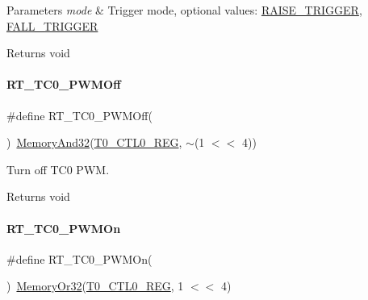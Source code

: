 \begin{DoxyParams}{Parameters}
{\em mode} & Trigger mode, optional values\+: \mbox{\hyperlink{a00020_abda90eda34a640b130f48a6ade23fe22}{R\+A\+I\+S\+E\+\_\+\+T\+R\+I\+G\+G\+ER}}, \mbox{\hyperlink{a00020_a9bbaf5b9e2125c7597249c7113b20e6c}{F\+A\+L\+L\+\_\+\+T\+R\+I\+G\+G\+ER}} \\
\hline
\end{DoxyParams}
\begin{DoxyReturn}{Returns}
void 
\end{DoxyReturn}
\mbox{\label{a00041_a043d535ff9aad665ddf1521169a0f187}} 
\paragraph{\texorpdfstring{R\+T\+\_\+\+T\+C0\+\_\+\+P\+W\+M\+Off}{RT\_TC0\_PWMOff}}
{\footnotesize\ttfamily \#define R\+T\+\_\+\+T\+C0\+\_\+\+P\+W\+M\+Off(\begin{DoxyParamCaption}{ }\end{DoxyParamCaption})~\mbox{\hyperlink{a00020_ad87cedffcaadc51db22594fce55173d4}{Memory\+And32}}(\mbox{\hyperlink{a00020_adadaa0ab1ebbd7ba9b70dfd24c3ed44da869abf9d87f78f45a0e07ad352abb39e}{T0\+\_\+\+C\+T\+L0\+\_\+\+R\+EG}}, $\sim$(1 $<$$<$ 4))}



Turn off T\+C0 P\+WM. 

\begin{DoxyReturn}{Returns}
void 
\end{DoxyReturn}
\mbox{\label{a00041_a70e69675d0a4e7d5095f938dffa14779}} 
\paragraph{\texorpdfstring{R\+T\+\_\+\+T\+C0\+\_\+\+P\+W\+M\+On}{RT\_TC0\_PWMOn}}
{\footnotesize\ttfamily \#define R\+T\+\_\+\+T\+C0\+\_\+\+P\+W\+M\+On(\begin{DoxyParamCaption}{ }\end{DoxyParamCaption})~\mbox{\hyperlink{a00020_a27874a97deab7cecdde5ddecf466e31e}{Memory\+Or32}}(\mbox{\hyperlink{a00020_adadaa0ab1ebbd7ba9b70dfd24c3ed44da869abf9d87f78f45a0e07ad352abb39e}{T0\+\_\+\+C\+T\+L0\+\_\+\+R\+EG}}, 1 $<$$<$ 4)}



